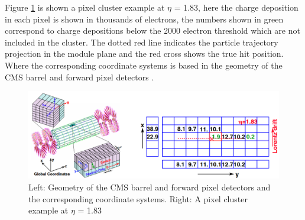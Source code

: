 Figure \ref{cluster} is shown a pixel cluster example at $\eta$ = 1.83, here the  charge deposition in each pixel is shown in thousands of electrons, the numbers shown in green correspond to charge depositions below the 2000 electron threshold which are not included in the cluster. The dotted red line indicates the particle trajectory projection in the module plane and the red cross shows the true hit position.  Where the corresponding coordinate systems is based in the  geometry of the CMS barrel and forward pixel detectors \cite{Pixel_Hit_Reconstruction}.

\begin{center}
  \begin{figure}[h]
    \centering
    \includegraphics[scale=.3]{Chapter2/pixel_cluster.png} 
    \caption[Pixel cluster]{ Left: Geometry of the CMS barrel and forward pixel detectors and the corresponding coordinate systems. Right: A pixel cluster example at $\eta$ = 1.83 }
    \label{cluster}
  \end{figure}
\end{center}
